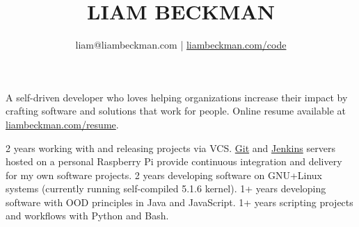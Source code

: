 


\title{\textcolor{my-red}{LIAM BECKMAN}}
\author{
liam@liambeckman.com | \href{https://liambeckman.com/code}{liambeckman.com/code}
}

\date{\vspace{-5ex}}



\maketitle

\begin{center}
    A self-driven developer who loves helping organizations increase their impact by crafting software and solutions that work for people.
    Online resume available at \textcolor{my-blue}{\href{https://liambeckman.com/resume}{liambeckman.com/resume}}.
\end{center}





\vspace{-1em}
\begin{itemize}[label=$\triangleright$]
    2 years working with and releasing projects via VCS. \textcolor{my-blue}{\href{https://git.liambeckman.com/}{Git}} and \textcolor{my-blue}{\href{https://liambeckman.com/jenkins/blue/organizations/jenkins/pipelines/}{Jenkins}} servers hosted on a personal Raspberry Pi provide continuous integration and delivery for my own software projects.
    2 years developing software on GNU+Linux systems (currently running self-compiled 5.1.6 kernel).
    1+ years developing software with OOD principles in Java and JavaScript.
    1+ years scripting projects and workflows with Python and Bash.
\end{itemize}

\medbreak








\vfill


\pagebreak





